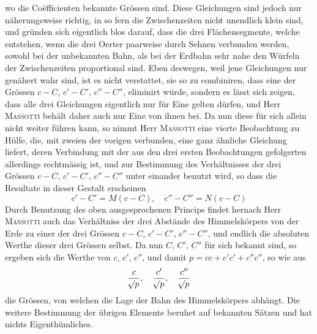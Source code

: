 wo die Coëfficienten bekannte Grössen sind. Diese Gleichungen sind jedoch nur näherungsweise richtig,
in so fern die Zwischenzeiten nicht unendlich klein sind, und gründen sich eigentlich blos darauf, dass
die drei Flächensegmente, welche entstehen, wenn die drei Oerter paarweise durch Sehnen verbunden
werden, sowohl bei der unbekannten Bahn, als bei der Erdbahn sehr nahe den Würfeln der Zwischenzeiten proportional sind. Eben deswegen, weil jene Gleichungen nur genähert wahr sind, ist es nicht
verstattet, sie so zu combiniren, dass eine der Grössen $c-C$, $c'-C'$, $c''-C''$, eliminirt würde, sondern
es lässt sich zeigen, dass alle drei Gleichungen eigentlich nur für Eine gelten dürfen, und Herr \textsc{Massotti} behält daher auch nur Eine von ihnen bei. Da nun diese für sich allein nicht weiter führen kann,
so nimmt Herr \textsc{Massotti} eine vierte Beobachtung zu Hülfe, die, mit zweien der vorigen verbunden, eine
ganz ähnliche Gleichung liefert, deren Verbindung mit der aus den drei ersten Beobachtungen gefolgerten allerdings rechtmässig ist, und zur Bestimmung des Verhältnisses der drei Grössen $c-C$, $c'-C'$,
$c''-C''$ unter einander benutzt wird, so dass die Resultate in dieser Gestalt erscheinen
\[
c'-C' = M(c-C), \quad c''-C'' = N(c-C)
\]
Durch Benutzung des oben ausgesprochenen Princips findet hernach Herr \textsc{Massotti} auch das Verhältniss
der drei Abstände des Himmelskörpers von der Erde zu einer der drei Grössen $c-C$, $c'-C'$, $c''-C''$,
und endlich die absoluten Werthe dieser drei Grössen selbst. Da nun $C$, $C'$, $C''$ für sich bekannt sind,
so ergeben sich die Werthe von $c$, $c'$, $c''$, und damit $p = cc+c'c'+c''c''$, so wie aus
\[
\frac{c}{\mathord{{}^{}\!\surd}p}, \quad \frac{c'}{\mathord{{}^{}\!\surd}p}, \quad \frac{c''}{\mathord{{}^{}\!\surd}p}
\]
die Grössen, von welchen die Lage der Bahn des Himmelskörpers abhängt. Die weitere Bestimmung
der übrigen Elemente beruhet auf bekannten Sätzen und hat nichts Eigenthümliches.

